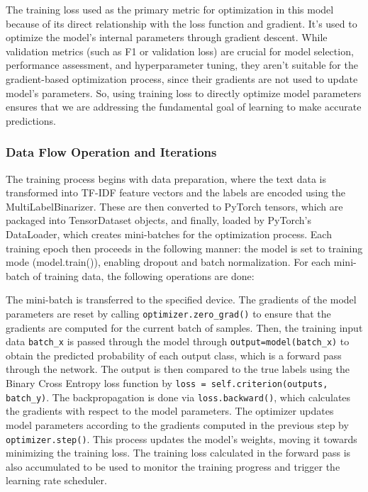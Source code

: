 \documentclass{article}
\begin{document}
The training loss used as the primary metric for optimization in this model because of its direct relationship with the loss function and gradient. It’s used to optimize the model’s internal parameters through gradient descent. While validation metrics (such as F1 or validation loss) are crucial for model selection, performance assessment, and hyperparameter tuning, they aren’t suitable for the gradient-based optimization process, since their gradients are not used to update model's parameters. So, using training loss to directly optimize model parameters ensures that we are addressing the fundamental goal of learning to make accurate predictions. 

\subsubsection{Data Flow Operation and Iterations}
The training process begins with data preparation, where the text data is transformed into TF-IDF feature vectors and the labels are encoded using the MultiLabelBinarizer. These are then converted to PyTorch tensors, which are packaged into TensorDataset objects, and finally, loaded by PyTorch's DataLoader, which creates mini-batches for the optimization process. Each training epoch then proceeds in the following manner: the model is set to training mode (model.train()), enabling dropout and batch normalization. For each mini-batch of training data, the following operations are done:


The mini-batch is transferred to the specified device. The gradients of the model parameters are reset by calling \texttt{optimizer.zero\_grad()} to ensure that the gradients are computed for the current batch of samples. Then, the training input data \texttt{batch\_x} is passed through the model through \texttt{output=model(batch\_x)} to obtain the predicted probability of each output class, which is a forward pass through the network. The output is then compared to the true labels using the Binary Cross Entropy loss function by \texttt{loss = self.criterion(outputs, batch\_y)}. The backpropagation is done via \texttt{loss.backward()}, which calculates the gradients with respect to the model parameters. The optimizer updates model parameters according to the gradients computed in the previous step by \texttt{optimizer.step()}. This process updates the model’s weights, moving it towards minimizing the training loss. The training loss calculated in the forward pass is also accumulated to be used to monitor the training progress and trigger the learning rate scheduler.
\end{document}
